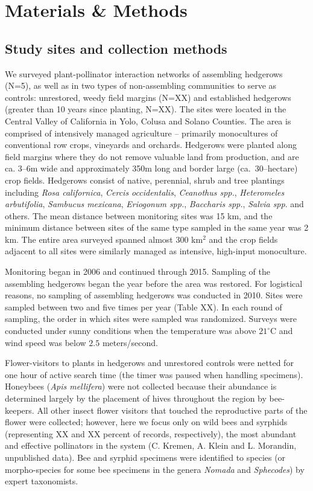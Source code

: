 \documentclass[12pt]{article}
\begin{document}
\section*{Materials \& Methods}
\label{sec:methods}

\subsection*{Study sites and collection methods}
\label{sec:study-sites}

We surveyed plant-pollinator interaction networks of assembling
hedgerows (N=5), as well as in two types of non-assembling communities
to serve as controls: unrestored, weedy field margins (N=XX) and
established hedgerows (greater than 10 years since planting,
N=XX). The sites were located in the Central Valley of California in
Yolo, Colusa and Solano Counties. The area is comprised of
intensively managed agriculture -- primarily monocultures of
conventional row crops, vineyards and orchards. Hedgerows were planted
along field margins where they do not remove valuable land from
production, and are ca. 3--6m wide and approximately 350m long and
border large (ca.\ 30--hectare) crop fields. Hedgerows consist of
native, perennial, shrub and tree plantings including \textit{Rosa
  californica}, \textit{Cercis occidentalis}, \textit{Ceanothus spp.},
\textit{Heteromeles arbutifolia}, \textit{Sambucus mexicana},
\textit{Eriogonum spp.}, \textit{Baccharis spp.}, \textit{Salvia
  spp}. and others. The mean distance between monitoring sites was 15
km, and the minimum distance between sites of the same type sampled in
the same year was 2 km.  The entire area surveyed spanned almost 300
km$^2$ and the crop fields adjacent to all sites were similarly managed
as intensive, high-input monoculture.

Monitoring began in 2006 and continued through 2015. Sampling of the
assembling hedgerows began the year before the area was restored. For
logistical reasons, no sampling of assembling hedgerows was conducted
in 2010. Sites were sampled between two and five times per year (Table
XX). In each round of sampling, the order in which sites were sampled
was randomized. Surveys were conducted under sunny conditions when the
temperature was above $21^{\circ}\mathrm{C}$ and wind speed was below
$2.5$ meters/second.

Flower-visitors to plants in hedgerows and unrestored controls were
netted for one hour of active search time (the timer was paused when
handling specimens). Honeybees (\textit{Apis mellifera}) were not
collected because their abundance is determined largely by the
placement of hives throughout the region by bee-keepers. All other
insect flower visitors that touched the reproductive parts of the
flower were collected; however, here we focus only on wild bees and
syrphids (representing XX and XX percent of records, respectively),
the most abundant and effective pollinators in the system (C. Kremen,
A. Klein and L. Morandin, unpublished data). Bee and syrphid specimens
were identified to species (or morpho-species for some bee specimens
in the genera \textit{Nomada} and \textit{Sphecodes}) by expert
taxonomists.
\end{document}
